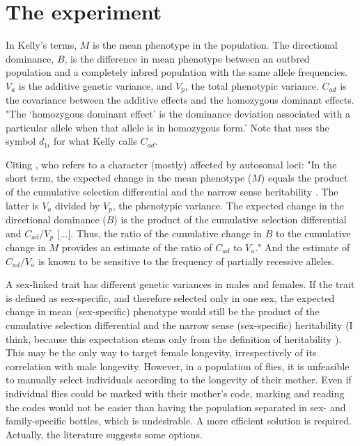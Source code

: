 \documentclass[a4paper,12pt]{article}
\begin{document}

\section{The experiment}
In Kelly's terms, $M$ is the mean phenotype in the population. The directional dominance, $B$, is the difference in mean phenotype between an outbred population and a completely inbred population with the same allele frequencies. $V_a$ is the additive genetic variance, and $V_p$, the total phenotypic variance. $C_{ad}$ is the covariance between the additive effects and the homozygous dominant effects. "The `homozygous dominant effect' is the dominance deviation associated with a particular allele when that allele is in homozygous form.' Note that \citet{Cockerham1984} uses the symbol $d_{1i}$ for what Kelly calls $C_{ad}$.

Citing \citet{Kelly1999}, who refers to a character (mostly) affected by autosomal loci: "In the short term, the expected change in the mean phenotype ($M$) equals the product of the cumulative selection differential and the narrow sense heritability \citep{Falconer1989}. The latter is $V_a$ divided by $V_p$, the phenotypic variance. The expected change in the directional dominance ($B$) is the product of the cumulative selection differential and $C_{ad} / V_p$ [...]. Thus, the ratio of the cumulative change in $B$ to the cumulative change in $M$ provides an estimate of the ratio of $C_{ad}$ to $V_a$." And the estimate of $C_{ad}/V_a$ is known to be sensitive to the frequency of partially recessive alleles.

A sex-linked trait has different genetic variances in males and females. If the trait is defined as sex-specific, and therefore selected only in one sex, the expected change in mean (sex-specific) phenotype would still be the product of the cumulative selection differential and the narrow sense (sex-specific) heritability (I think, because this expectation stems only from the definition of heritability \citep[page XX]{Falconer1989}). This may be the only way to target female longevity, irrespectively of its correlation with male longevity. However, in a population of flies, it is unfeasible to manually select individuals according to the longevity of their mother. Even if individual flies could be marked with their mother's code, marking and reading the codes would not be easier than having the population separated in sex- and family-specific bottles, which is undesirable. A more efficient solution is required. Actually, the literature suggests some options.
\end{document}
